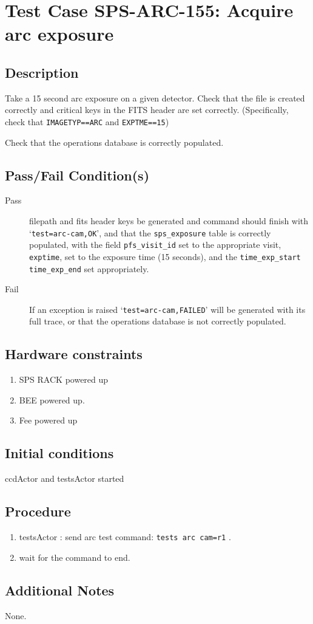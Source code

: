 \section{Test Case SPS-ARC-155: Acquire arc exposure}

\subsection{Description}

Take a 15 second arc exposure on a given detector. Check that the file is created correctly
and critical keys in the FITS header are set correctly. 
(Specifically, check that \texttt{IMAGETYP==ARC} and \texttt{EXPTME==15})


Check that the operations database is correctly populated.


\subsection{Pass/Fail Condition(s)}

\begin{description}
\item [Pass] filepath and fits header keys be generated and command should finish with `\texttt{test=arc-cam,OK}', 
and that the \texttt{sps\_exposure} table is correctly populated, 
with the field \texttt{pfs\_visit\_id} set to the appropriate visit, \texttt{exptime}, 
set to the exposure time (15 seconds), and the \texttt{time\_exp\_start} \texttt{time\_exp\_end} set appropriately.
\item [Fail] If an exception is raised `\texttt{test=arc-cam,FAILED}' will be generated with its full trace, 
or that the operations database is not correctly populated.

\end{description}

\subsection{Hardware constraints}

\begin{enumerate}
    \item SPS RACK powered up
    \item \acrshort{BEE} powered up.
    \item Fee powered up
\end{enumerate}

\subsection{Initial conditions}

ccdActor and testsActor started

\subsection{Procedure}

\begin{enumerate}
    \item testsActor : send arc test command: \texttt{tests arc cam=r1} .
    \item wait for the command to end.
\end{enumerate}

\subsection{Additional Notes}
None.
